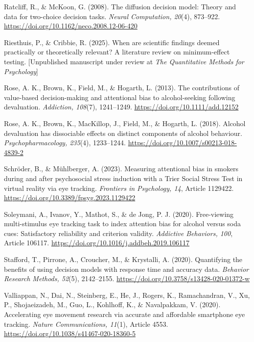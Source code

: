 \documentclass[authordate, reflection, issue]{jote-new-article}
\begin{document}
	Ratcliff, R., \& McKoon, G. (2008). The diffusion decision model: Theory and data for two-choice decision tasks. \emph{Neural Computation, 20}(4), 873--922. \url{https://doi.org/10.1162/neco.2008.12-06-420}



	Riesthuis, P., \& Cribbie, R. (2025). When are scientific findings deemed practically or theoretically relevant? A literature review on minimum-effect testing. [Unpublished manuscript under review at \emph{The Quantitative Methods for Psychology}]



	Rose, A. K., Brown, K., Field, M., \& Hogarth, L. (2013). The contributions of value-based decision-making and attentional bias to alcohol-seeking following devaluation. \emph{Addiction, 108}(7), 1241--1249. \url{https://doi.org/10.1111/add.12152}



	Rose, A. K., Brown, K., MacKillop, J., Field, M., \& Hogarth, L. (2018). Alcohol devaluation has dissociable effects on distinct components of alcohol behaviour. \emph{Psychopharmacology, 235}(4), 1233--1244. \url{https://doi.org/10.1007/s00213-018-4839-2}



	Schröder, B., \& Mühlberger, A. (2023). Measuring attentional bias in smokers during and after psychosocial stress induction with a Trier Social Stress Test in virtual reality via eye tracking. \emph{Frontiers in Psychology, 14}, Article 1129422. \url{https://doi.org/10.3389/fpsyg.2023.1129422}



	Soleymani, A., Ivanov, Y., Mathot, S., \& de Jong, P. J. (2020). Free-viewing multi-stimulus eye tracking task to index attention bias for alcohol versus soda cues: Satisfactory reliability and criterion validity. \emph{Addictive Behaviors, 100}, Article 106117. \url{https://doi.org/10.1016/j.addbeh.2019.106117}



	Stafford, T., Pirrone, A., Croucher, M., \& Krystalli, A. (2020). Quantifying the benefits of using decision models with response time and accuracy data. \emph{Behavior Research Methods, 52}(5), 2142--2155. \url{https://doi.org/10.3758/s13428-020-01372-w}



	Valliappan, N., Dai, N., Steinberg, E., He, J., Rogers, K., Ramachandran, V., Xu, P., Shojaeizadeh, M., Guo, L., Kohlhoff, K., \& Navalpakkam, V. (2020). Accelerating eye movement research via accurate and affordable smartphone eye tracking. \emph{Nature Communications, 11}(1), Article 4553. \url{https://doi.org/10.1038/s41467-020-18360-5}
\end{document}
